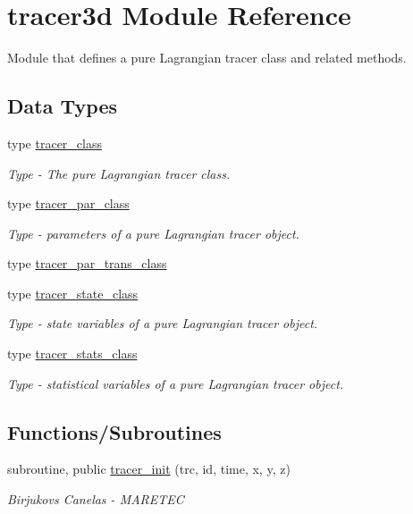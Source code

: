 \hypertarget{namespacetracer3d}{}\section{tracer3d Module Reference}
\label{namespacetracer3d}


Module that defines a pure Lagrangian tracer class and related methods.  


\subsection*{Data Types}
\begin{DoxyCompactItemize}
\item 
type \mbox{\hyperlink{structtracer3d_1_1tracer__class}{tracer\+\_\+class}}
\begin{DoxyCompactList}\small\item\em Type -\/ The pure Lagrangian tracer class. \end{DoxyCompactList}\item 
type \mbox{\hyperlink{structtracer3d_1_1tracer__par__class}{tracer\+\_\+par\+\_\+class}}
\begin{DoxyCompactList}\small\item\em Type -\/ parameters of a pure Lagrangian tracer object. \end{DoxyCompactList}\item 
type \mbox{\hyperlink{structtracer3d_1_1tracer__par__trans__class}{tracer\+\_\+par\+\_\+trans\+\_\+class}}
\item 
type \mbox{\hyperlink{structtracer3d_1_1tracer__state__class}{tracer\+\_\+state\+\_\+class}}
\begin{DoxyCompactList}\small\item\em Type -\/ state variables of a pure Lagrangian tracer object. \end{DoxyCompactList}\item 
type \mbox{\hyperlink{structtracer3d_1_1tracer__stats__class}{tracer\+\_\+stats\+\_\+class}}
\begin{DoxyCompactList}\small\item\em Type -\/ statistical variables of a pure Lagrangian tracer object. \end{DoxyCompactList}\end{DoxyCompactItemize}
\subsection*{Functions/\+Subroutines}
\begin{DoxyCompactItemize}
\item 
subroutine, public \mbox{\hyperlink{namespacetracer3d_a42aa514ae0b5c46c797ddaaa48c49991}{tracer\+\_\+init}} (trc, id, time, x, y, z)
\begin{DoxyCompactList}\small\item\em Birjukovs Canelas -\/ M\+A\+R\+E\+T\+EC \end{DoxyCompactList}\end{DoxyCompactItemize}


